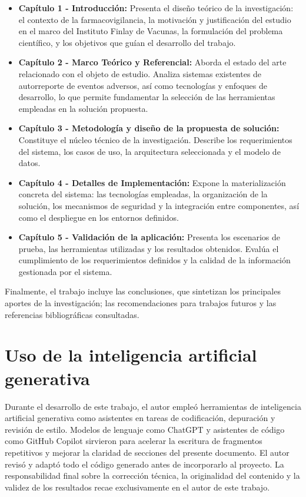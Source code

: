 \begin{itemize}
    \item \textbf{Capítulo 1 - Introducción:} Presenta el diseño teórico de la investigación: el contexto de la farmacovigilancia, la motivación y justificación del estudio en el marco del Instituto Finlay de Vacunas, la formulación del problema científico, y los objetivos que guían el desarrollo del trabajo.

    \item \textbf{Capítulo 2 - Marco Teórico y Referencial:} Aborda el estado del arte relacionado con el objeto de estudio. Analiza sistemas existentes de autorreporte de eventos adversos, así como tecnologías y enfoques de desarrollo, lo que permite fundamentar la selección de las herramientas empleadas en la solución propuesta.

    \item \textbf{Capítulo 3 - Metodología y diseño de la propuesta de solución:} Constituye el núcleo técnico de la investigación. Describe los requerimientos del sistema, los casos de uso, la arquitectura seleccionada y el modelo de datos.

    \item \textbf{Capítulo 4 - Detalles de Implementación:} Expone la materialización concreta del sistema: las tecnologías empleadas, la organización de la solución, los mecanismos de seguridad y la integración entre componentes, así como el despliegue en los entornos definidos.

    \item \textbf{Capítulo 5 - Validación de la aplicación:} Presenta los escenarios de prueba, las herramientas utilizadas y los resultados obtenidos. Evalúa el cumplimiento de los requerimientos definidos y la calidad de la información gestionada por el sistema.

\end{itemize}

Finalmente, el trabajo incluye las conclusiones, que sintetizan los principales aportes de la investigación; las recomendaciones para trabajos futuros y las referencias bibliográficas consultadas.


\section*{Uso de la inteligencia artificial generativa}

Durante el desarrollo de este trabajo, el autor empleó herramientas de inteligencia artificial generativa como asistentes en tareas de codificación, depuración y revisión de estilo. Modelos de lenguaje como ChatGPT y asistentes de código como GitHub Copilot sirvieron para acelerar la escritura de fragmentos repetitivos y mejorar la claridad de secciones del presente documento. El autor revisó y adaptó todo el código generado antes de incorporarlo al proyecto. La responsabilidad final sobre la corrección técnica, la originalidad del contenido y la validez de los resultados recae exclusivamente en el autor de este trabajo.